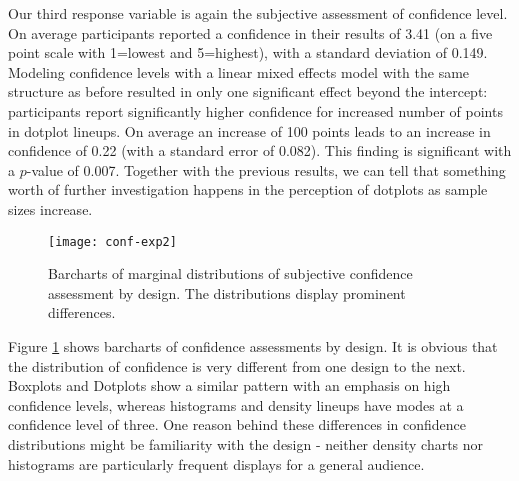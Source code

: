 Our third response variable is again the subjective assessment of confidence level. On average participants reported a confidence in their results of  3.41 (on a five point scale with 1=lowest and 5=highest), with a standard deviation of 0.149. Modeling confidence levels with a linear mixed effects model with the same structure as before resulted in only one significant effect beyond the intercept: participants report significantly higher confidence for increased number of  points in dotplot lineups. On average an increase of 100 points leads to an increase in confidence of 0.22 (with a standard error of 0.082). This finding is significant with a $p$-value of 0.007. 
Together with the previous results, we can tell that something worth of further investigation happens in the perception of dotplots as sample sizes increase. 


\begin{figure}[htbp] %
   \centering
   \texttt{[image: conf-exp2]} 
   \caption{Barcharts of marginal distributions of subjective confidence assessment by design. The distributions display prominent differences.}
   \label{fig:conf-margins}
\end{figure}

Figure \ref{fig:conf-margins} shows barcharts of confidence assessments by design. It is obvious that the distribution of confidence is very different from one design to the next. Boxplots and Dotplots show a similar pattern with an emphasis on high confidence levels, whereas histograms and density lineups have modes at a confidence level of three. One reason behind these differences in confidence distributions might be familiarity with the design - neither density charts nor histograms are particularly frequent displays for a general audience.
